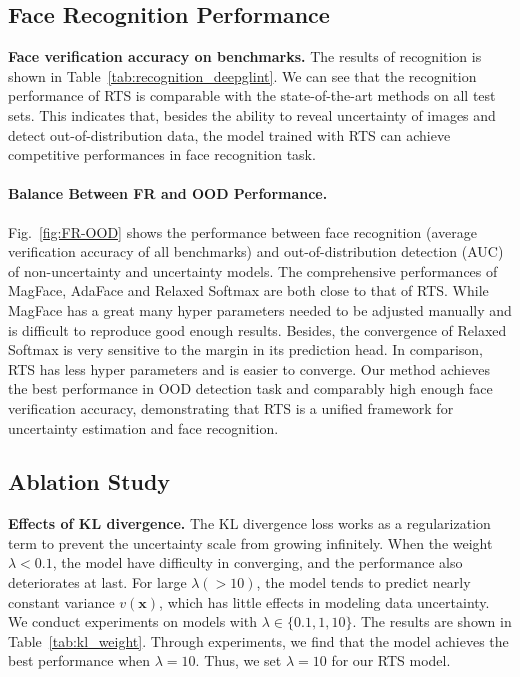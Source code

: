 \documentclass[letterpaper]{article} %
\begin{document}
\vspace{-0.75mm}
\vspace{-1.88mm}
\subsection{Face Recognition Performance}
\label{ssec:face recognition}
\textbf{Face verification accuracy on benchmarks.} The results of recognition is shown in Table~\ref{tab:recognition_deepglint}. We can see that the recognition performance of RTS is comparable with the state-of-the-art methods on all test sets. This indicates that, besides the ability to reveal uncertainty of images and detect out-of-distribution data, the model trained with RTS can achieve competitive performances in face recognition task.

\paragraph{Balance Between FR and OOD Performance. } Fig.~\ref{fig:FR-OOD} shows the performance between face recognition (average verification accuracy of all benchmarks) and out-of-distribution detection (AUC) of non-uncertainty and uncertainty models. The comprehensive performances of MagFace, AdaFace and Relaxed Softmax are both close to that of RTS. While MagFace has a great many hyper parameters needed to be adjusted manually and is difficult to reproduce good enough results. Besides, the convergence of Relaxed Softmax is very sensitive to the margin in its prediction head. In comparison, RTS has less hyper parameters and is easier to converge. Our method achieves the best performance in OOD detection task and comparably high enough face verification accuracy, demonstrating that RTS is a unified framework for uncertainty estimation and face recognition.










\vspace{-1.44mm}
\subsection{Ablation Study}
\label{ssec:ablation}

\textbf{Effects of KL divergence.} The KL divergence loss works as a regularization term to prevent the uncertainty scale from growing infinitely. When the weight $\lambda < 0.1$, the model have difficulty in converging, and the performance also deteriorates at last.
For large $\lambda (>10)$, the model tends to predict nearly constant variance $v(\bm{x})$, which has little effects in modeling data uncertainty.
We conduct experiments on models with $\lambda \in \{0.1, 1, 10\}$. The results are shown in Table~\ref{tab:kl_weight}.
Through experiments, we find that the model achieves the best performance when $\lambda = 10$. Thus, we set $\lambda = 10$ for our RTS model.
\end{document}
